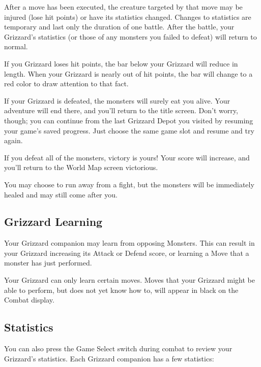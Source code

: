 \documentclass[10pt,twocolumn,openany,article]{memoir}
\begin{document}
After a move  has been executed, the creature targeted  by that move may
be injured (lose hit points) or  have its statistics changed. Changes to
statistics  are temporary  and last  only  the duration  of one  battle.
After the battle,  your Grizzard's statistics (or those  of any monsters
you failed to defeat) will return to normal.

If  you Grizzard  loses hit  points, the  bar below  your Grizzard  will
reduce in  length. When your Grizzard  is nearly out of  hit points, the
bar will change to a red color to draw attention to that fact.

If your  Grizzard is defeated, the  monsters will surely eat  you alive.
Your adventure  will end there, and  you'll return to the  title screen.
Don't worry, though;  you can continue from the last  Grizzard Depot you
visited by  resuming your  game's saved progress.  Just choose  the same
game slot and resume and try again.

If you  defeat all of  the monsters, victory  is yours! Your  score will
increase, and you'll return to the World Map screen victorious.

You  may choose  to run  away from  a fight,  but the  monsters will  be
immediately healed and may still come after you.

\subsection{Grizzard Learning}

Your  Grizzard companion  may  learn from  opposing  Monsters. This  can
result  in your  Grizzard  increasing  its Attack  or  Defend score,  or
learning a Move that a monster has just performed.

Your Grizzard  can only  learn certain moves.  Moves that  your Grizzard
might be able to  perform, but does not yet know how  to, will appear in
black on the Combat display.

\subsection{Statistics}

You can also  press the Game Select switch during  combat to review your
Grizzard's statistics. Each Grizzard companion has a few statistics:
\end{document}
